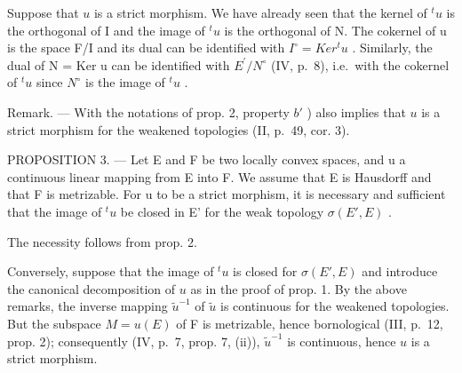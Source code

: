 Suppose that \(u\) is a strict morphism. We have already seen that the kernel of \(^t u\) is the orthogonal of I and the image of \(^t u\) is the orthogonal of N. The cokernel of u is the space F/I and its dual can be identified with \(I^{\circ} = Ker^{t}u\) . Similarly, the dual of N = Ker u can be identified with \(E^{\prime}/N^{\circ}\) (IV, p.~8), i.e.~with the cokernel of \(^{t}u\) since \(N^{\circ}\) is the image of \(^{t}u\) .

Remark. --- With the notations of prop. 2, property \(b'\) ) also implies that \(u\) is a strict morphism for the weakened topologies (II, p.~49, cor. 3).

PROPOSITION 3. --- Let E and F be two locally convex spaces, and u a continuous linear mapping from E into F. We assume that E is Hausdorff and that F is metrizable. For u to be a strict morphism, it is necessary and sufficient that the image of \({}^t u\) be closed in E' for the weak topology \(\sigma(E', E)\) .

The necessity follows from prop. 2.

Conversely, suppose that the image of \(^t u\) is closed for \(\sigma(E', E)\) and introduce the canonical decomposition of \(u\) as in the proof of prop. 1. By the above remarks, the inverse mapping \(\tilde{u}^{-1}\) of \(\tilde{u}\) is continuous for the weakened topologies. But the subspace \(M = u(E)\) of F is metrizable, hence bornological (III, p.~12, prop. 2); consequently (IV, p.~7, prop. 7, (ii)), \(\tilde{u}^{-1}\) is continuous, hence \(u\) is a strict morphism.
